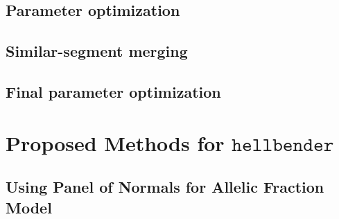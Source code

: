 \documentclass[nofootinbib,amssymb,amsmath]{revtex4}
\begin{document}
\subsection{Parameter optimization}\label{parameter-optimization}

\subsection{Similar-segment merging} \label{similar-segment-merging}

\subsection{Final parameter optimization} \label{final-parameter-optimization}

\section{Proposed Methods for $\texttt{hellbender}$} \label{proposed-methods-for-texttthellbender}

\subsection{Using Panel of Normals for Allelic Fraction Model} \label{allelic-PoN}
\end{document}
